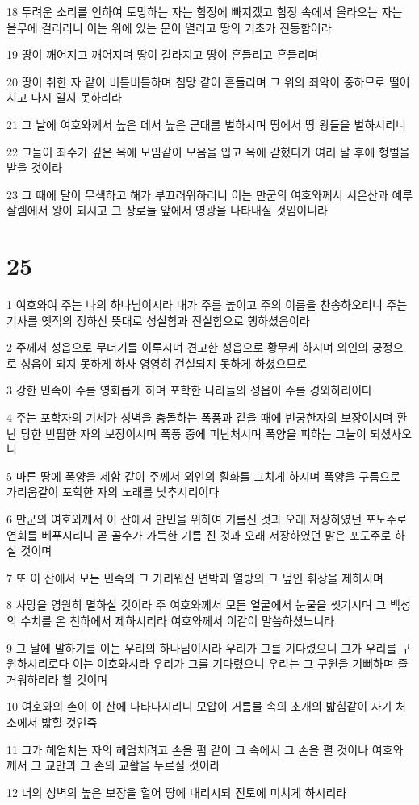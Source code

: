 \par 18 두려운 소리를 인하여 도망하는 자는 함정에 빠지겠고 함정 속에서 올라오는 자는 올무에 걸리리니 이는 위에 있는 문이 열리고 땅의 기초가 진동함이라
\par 19 땅이 깨어지고 깨어지며 땅이 갈라지고 땅이 흔들리고 흔들리며
\par 20 땅이 취한 자 같이 비틀비틀하며 침망 같이 흔들리며 그 위의 죄악이 중하므로 떨어지고 다시 일지 못하리라
\par 21 그 날에 여호와께서 높은 데서 높은 군대를 벌하시며 땅에서 땅 왕들을 벌하시리니
\par 22 그들이 죄수가 깊은 옥에 모임같이 모음을 입고 옥에 갇혔다가 여러 날 후에 형벌을 받을 것이라
\par 23 그 때에 달이 무색하고 해가 부끄러워하리니 이는 만군의 여호와께서 시온산과 예루살렘에서 왕이 되시고 그 장로들 앞에서 영광을 나타내실 것임이니라

\chapter{25}

\par 1 여호와여 주는 나의 하나님이시라 내가 주를 높이고 주의 이름을 찬송하오리니 주는 기사를 옛적의 정하신 뜻대로 성실함과 진실함으로 행하셨음이라
\par 2 주께서 성읍으로 무더기를 이루시며 견고한 성읍으로 황무케 하시며 외인의 궁정으로 성읍이 되지 못하게 하사 영영히 건설되지 못하게 하셨으므로
\par 3 강한 민족이 주를 영화롭게 하며 포학한 나라들의 성읍이 주를 경외하리이다
\par 4 주는 포학자의 기세가 성벽을 충돌하는 폭풍과 같을 때에 빈궁한자의 보장이시며 환난 당한 빈핍한 자의 보장이시며 폭풍 중에 피난처시며 폭양을 피하는 그늘이 되셨사오니
\par 5 마른 땅에 폭양을 제함 같이 주께서 외인의 훤화를 그치게 하시며 폭양을 구름으로 가리움같이 포학한 자의 노래를 낮추시리이다
\par 6 만군의 여호와께서 이 산에서 만민을 위하여 기름진 것과 오래 저장하였던 포도주로 연회를 베푸시리니 곧 골수가 가득한 기름 진 것과 오래 저장하였던 맑은 포도주로 하실 것이며
\par 7 또 이 산에서 모든 민족의 그 가리워진 면박과 열방의 그 덮인 휘장을 제하시며
\par 8 사망을 영원히 멸하실 것이라 주 여호와께서 모든 얼굴에서 눈물을 씻기시며 그 백성의 수치를 온 천하에서 제하시리라 여호와께서 이같이 말씀하셨느니라
\par 9 그 날에 말하기를 이는 우리의 하나님이시라 우리가 그를 기다렸으니 그가 우리를 구원하시리로다 이는 여호와시라 우리가 그를 기다렸으니 우리는 그 구원을 기뻐하며 즐거워하리라 할 것이며
\par 10 여호와의 손이 이 산에 나타나시리니 모압이 거름물 속의 초개의 밟힘같이 자기 처소에서 밟힐 것인즉
\par 11 그가 헤엄치는 자의 헤엄치려고 손을 폄 같이 그 속에서 그 손을 펼 것이나 여호와께서 그 교만과 그 손의 교활을 누르실 것이라
\par 12 너의 성벽의 높은 보장을 헐어 땅에 내리시되 진토에 미치게 하시리라

